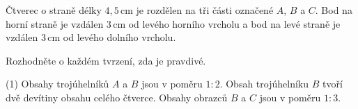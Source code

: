 \documentclass[12pt,a4paper]{article}
\begin{document}

\begin{exercise}

    Čtverec o straně délky $4{,}5\,\mathrm{cm}$ je rozdělen na tři části
    označené $A$, $B$ a $C$. Bod na horní straně je vzdálen
    $3\,\mathrm{cm}$ od levého horního vrcholu a bod na levé straně je
    vzdálen $3\,\mathrm{cm}$ od levého dolního vrcholu.

    \begin{center}
    \end{center}

    Rozhodněte o každém tvrzení, zda je pravdivé.

    \begin{tasks}(1)
        \task Obsahy trojúhelníků $A$ a $B$ jsou v poměru $1:2$.
        \task Obsah trojúhelníku $B$ tvoří dvě devítiny obsahu celého čtverce.
        \task Obsahy obrazců $B$ a $C$ jsou v poměru $1:3$.
    \end{tasks}

\end{exercise}


\end{document}
